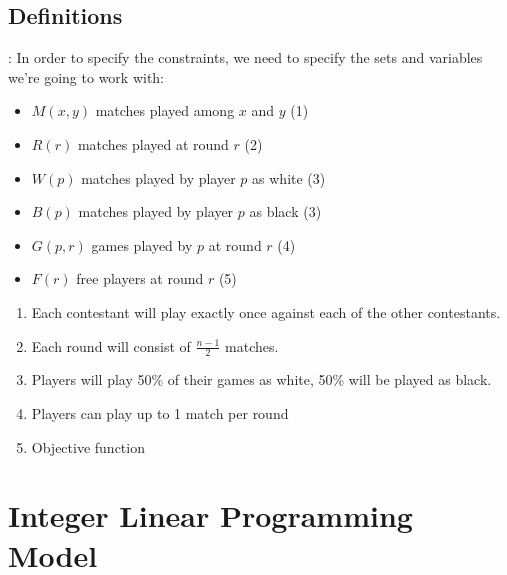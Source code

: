 \documentclass[9pt, aspectratio=169, xcolor=table]{beamer}
\begin{document}
\subsection{Definitions}
\begin{frame}{\secname: \subsecname}
    In order to specify the constraints, we need to specify the sets and variables we're going to work with:
    \vspace{1cm}

    \begin{minipage}{0.49\textwidth}
	\begin{itemize}
	    \item $M(x, y)$ matches played among $x$ and $y$ (\textcolor{Veronablue}{1})
	    \item $R(r)$  matches played at round $r$ (\textcolor{Veronablue}{2})
	    \item $W(p)$ matches played by player $p$ as white (\textcolor{Veronablue}{3})
	    \item $B(p)$ matches played by player $p$ as black (\textcolor{Veronablue}{3})
	    \item $G(p,r)$ games played by $p$ at round $r$ (\textcolor{Veronablue}{4})
	    \item $F(r)$ free players at round $r$ (\textcolor{Veronablue}{5})
	\end{itemize}
    \end{minipage}
    \hfill
    \begin{minipage}{0.49\textwidth}
	\begin{enumerate}
	    \item Each contestant will play exactly once against each of the other contestants.
	    \item Each round will consist of $\frac{n-1}{2}$ matches.
	    \item Players will play 50\% of their games as white, 50\% will be played as black.
	    \item Players can play up to 1 match per round
	    \item Objective function
	\end{enumerate}
    \end{minipage}
    
\end{frame}

\section{Integer Linear Programming Model}
\end{document}
